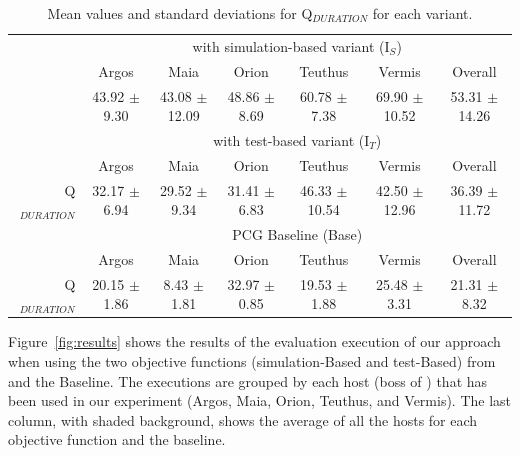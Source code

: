 \begin{table}[ht!]
\centering
\caption{Mean values and standard deviations for Q$_{DURATION}$ for each variant.}
\label{tab:results}
\begin{tabular}{@{}ccccccc@{}}
\toprule
                                   & \multicolumn{6}{c}{\ApproachName{} with simulation-based variant (I$_S$)}                                           \\ \cmidrule(l){2-7} 
                                   & Argos            & Maia              & Orion            & Teuthus           & Vermis            & Overall           \\ \midrule
                                   \rowcolor[HTML]{C0C0C0}
\multicolumn{1}{r}{\cellcolor[HTML]{FFFFFF}{Q$_{DURATION}$}} & 43.92 $\pm$ 9.30 & 43.08 $\pm$ 12.09 & 48.86 $\pm$ 8.69 & 60.78 $\pm$ 7.38  & 69.90 $\pm$ 10.52 & 53.31 $\pm$ 14.26 \\ \midrule
                                   & \multicolumn{6}{c}{\ApproachName{} with test-based variant (I$_T$)}                                                 \\ \cmidrule(l){2-7} 
                                   & Argos            & Maia              & Orion            & Teuthus           & Vermis            & Overall           \\ \midrule
\multicolumn{1}{r}{Q$_{DURATION}$} & 32.17 $\pm$ 6.94 & 29.52 $\pm$ 9.34  & 31.41 $\pm$ 6.83 & 46.33 $\pm$ 10.54 & 42.50 $\pm$ 12.96 & 36.39 $\pm$ 11.72 \\ \midrule
                                   & \multicolumn{6}{c}{PCG Baseline (Base)}                                                                             \\ \cmidrule(l){2-7} 
                                   & Argos            & Maia              & Orion            & Teuthus           & Vermis            & Overall           \\ \midrule
\multicolumn{1}{r}{Q$_{DURATION}$} & 20.15 $\pm$ 1.86 & 8.43 $\pm$ 1.81   & 32.97 $\pm$ 0.85 & 19.53 $\pm$ 1.88  & 25.48 $\pm$ 3.31  & 21.31 $\pm$ 8.32  \\ \bottomrule
\end{tabular}
\end{table}

Figure~\ref{fig:results} shows the results of the evaluation execution of our approach when using the two objective functions (simulation-Based and test-Based) from \ApproachName{} and the Baseline. The executions are grouped by each host (boss of \CaseStudy{}) that has been used in our experiment (Argos, Maia, Orion, Teuthus, and Vermis). The last column, with shaded background, shows the average of all the hosts for each objective function and the baseline. 

